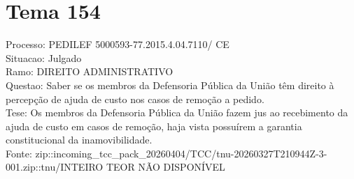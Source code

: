 \documentclass[12pt]{article}
\begin{document}
\section*{Tema 154}
Processo: PEDILEF 5000593-77.2015.4.04.7110/ CE\\
Situacao: Julgado\\
Ramo: DIREITO ADMINISTRATIVO\\
Questao: Saber se os membros da Defensoria Pública da União têm direito à percepção de ajuda de custo nos casos de remoção a pedido.\\
Tese: Os membros da Defensoria Pública da União fazem jus ao recebimento da ajuda de custo em casos de remoção, haja vista possuírem a garantia constitucional da inamovibilidade.\\
Fonte: zip::incoming\_tcc\_pack\_20260404/TCC/tnu-20260327T210944Z-3-001.zip::tnu/INTEIRO TEOR NÃO DISPONÍVEL
\end{document}
